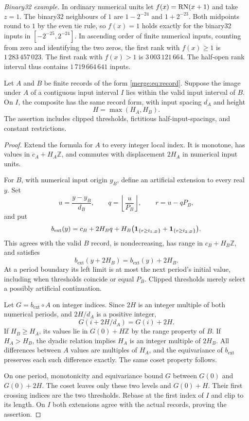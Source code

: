 \noindent\emph{Binary32 example.}
In ordinary numerical units let $f(x)=\operatorname{RN}(x+1)$ and take $z=1$.
The binary32 neighbours of $1$ are $1-2^{-24}$ and $1+2^{-23}$.
Both midpoints round to $1$ by the even tie rule, so $f(x)=1$
holds exactly for the binary32 inputs in $[-2^{-25},2^{-24}]$.
In ascending order of finite numerical inputs, counting from zero and
identifying the two zeros, the first rank with $f(x)\geq1$ is
$1\,283\,457\,023$. The first rank with $f(x)>1$ is $3\,003\,121\,664$.
The half-open rank interval thus contains $1\,719\,664\,641$ inputs.

\begin{lemma}\label{merge:lem:closure}
Let $A$ and $B$ be finite records of the form \eqref{merge:eq:record}.
Suppose the image under $A$ of a contiguous input interval $I$ lies
within the valid input interval of $B$. On $I$, the composite has the
same record form, with input spacing $d_A$ and height
\[
 H=\max(H_A,H_B).
\]
The assertion includes clipped thresholds, fictitious half-input-spacings,
and constant restrictions.
\end{lemma}

\begin{proof}
Extend the formula for $A$ to every integer local index. It is monotone,
has values in $c_A+H_A\mathbb Z$, and commutes with displacement $2H_A$ in
numerical input units.

For $B$, with numerical input origin $y_B$, define an artificial extension
to every real $y$. Set
\[
 u=\frac{y-y_B}{d_B},\qquad q=\left\lfloor\frac{u}{P_B}\right\rfloor,
 \qquad r=u-qP_B,
\]
and put
\[
 b_{\mathrm{ext}}(y)=c_B+2H_Bq+
 H_B\bigl(\mathbf{1}_{\{r\geq t_{1,B}\}}+\mathbf{1}_{\{r\geq t_{2,B}\}}\bigr).
\]
This agrees with the valid $B$ record, is nondecreasing, has range in
$c_B+H_B\mathbb Z$, and satisfies
\[
 b_{\mathrm{ext}}(y+2H_B)=b_{\mathrm{ext}}(y)+2H_B.
\]
At a period boundary its left limit is at most the next period's initial
value, including when thresholds coincide or equal $P_B$. Clipped
thresholds merely select a possibly artificial continuation.

Let $G=b_{\mathrm{ext}}\circ A$ on integer indices. Since $2H$ is an
integer multiple of both numerical periods, and $2H/d_A$ is a positive
integer,
\[
 G(i+2H/d_A)=G(i)+2H.
\]
If $H_B\geq H_A$, its values lie in $G(0)+H\mathbb Z$ by the range property
of $B$. If $H_A>H_B$, the dyadic relation implies $H_A$ is an integer
multiple of $2H_B$. All differences between $A$ values are multiples of
$H_A$, and the equivariance of $b_{\mathrm{ext}}$ preserves each such
difference exactly. The same coset property follows.

On one period, monotonicity and equivariance bound $G$ between $G(0)$
and $G(0)+2H$. The coset leaves only these two levels and $G(0)+H$.
Their first crossing indices are the two thresholds. Rebase at the first
index of $I$ and clip to its length. On $I$ both extensions agree with
the actual records, proving the assertion.
\end{proof}

